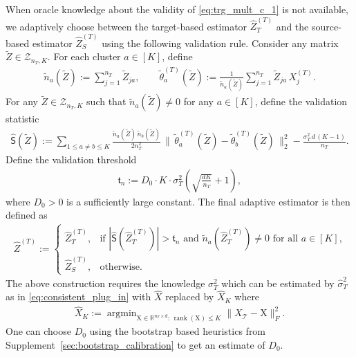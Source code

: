 \documentclass[10pt]{article}
\newcommand{\R}{\mathbb R}
\newcommand{\wh}{\widehat}
\newcommand{\wt}{\widetilde}
\DeclareMathOperator{\argmin}{\arg\min}
\newcommand{\calT}{\mathcal T}
\newcommand{\trg}{T}
\newcommand{\nT}{n_{\trg}}
\newcommand{\sigmaT}{\sigma_{\trg}}
\newcommand{\Xtar}{X^{(\trg)}}
\newcommand{\hatZtar}{\wh{Z}^{(\trg)}}
\newcommand{\src}{S}
\begin{document}
When oracle knowledge about the validity of \eqref{eq:trg_mult_c_1} is not available, we adaptively choose between the target-based estimator $\hatZtar_\trg$ and the source-based estimator $\hatZtar_\src$ using the following validation rule. Consider any matrix $\wt Z\in\mathcal Z_{\nT,K}$. For each cluster $a\in[K]$, define
\begin{align}
\label{eq:candiate_cluster_size_cluster_mean}
    \wt n_a(\wt Z):=\sum_{j=1}^{\nT}\wt Z_{ja}, \qquad
    \wt{\theta}^{(\trg)}_a(\wt Z):=\frac{1}{\wt n_a(\wt Z)}
    \sum_{j=1}^{\nT}\wt Z_{ja}\,\Xtar_j.
\end{align}
For any $\wt Z \in \mathcal Z_{\nT,K}$ such that $\wt n_a(\wt Z) \neq 0$ for any $a \in [K]$, define the validation statistic
\begin{align}
\label{eq:validation_stat_mult_clust}
    \wh{\mathsf{S}}(\wt Z):=
    \sum_{1 \le a \neq b \le K}\frac{\wt n_a(\wt Z)\,\wt n_b(\wt Z)}{2\nT^2}\,
    \|\,\wt{\theta}^{(\trg)}_a(\wt Z)-\wt{\theta}^{(\trg)}_b(\wt Z)\,\|^2_2
    -\frac{\sigmaT^2\,d\,(K-1)}{\nT}.
\end{align}
Define the validation threshold
\begin{align}
\label{eq:validation_threshold__mult_clust}
    \mathfrak{t}_n:= D_0\cdot K \cdot\sigmaT^2
    \left(\sqrt{\frac{dK}{\nT}}+1\right),
\end{align}
where $D_0>0$ is a sufficiently large constant. The final adaptive estimator is then defined as
\begin{align}
\label{eq:mult_clust_adaptive}
    \hatZtar:=\begin{cases}
        \hatZtar_\trg, & \mbox{if $|\wh{\mathsf{S}}(\hatZtar_\trg)| > \mathfrak{t}_n$ and $\wt n_a(\hatZtar_\trg) \neq 0$ for all $a \in [K]$,}\\
        \hatZtar_\src, & \mbox{otherwise.}
    \end{cases}
\end{align}
The above construction requires the knowledge $\sigmaT^2$ which can be estimated by $\wh \sigma^2_T$ as in \eqref{eq:consistent_plug_in} with $\wh X$ replaced by $\wh X_K$ where
\begin{align}
\label{eq:estimate_sigma_hat_per_mult}
    \wh X_K:=\argmin_{\mathrm X \in \R^{\nT \times d}:\,
    \operatorname{rank}(\mathrm X) \le K}\|X_\calT-\mathrm X\|^2_F.
\end{align}
One can choose $D_0$ using the bootstrap based heuristics from Supplement~\ref{sec:bootstrap_calibration} to get an estimate of $D_0$.
\end{document}
